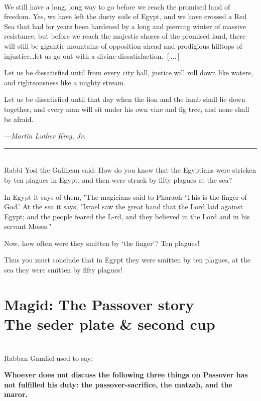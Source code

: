\documentclass[a4paper,10pt,openany]{memoir}
\newcommand{\HgEllipsis}{\ensuremath{\left[\ldots\right]}}
\newcommand{\HgSource}[1]{\hfill{\small---\itshape{#1}}}
\newcommand{\HgHL}[1]{{\Large\textbf{#1}\par\noindent\\[-.5em]}}
\newcommand{\HgFill}{\vfill \hrule \vfill}
\newenvironment{HgEnglish}{\strut\\\noindent}{\vspace{1em}}
\newcommand{\LSrc}{\textsuperscript{\upshape{[L]}}}
\begin{document}
\begin{HgEnglish}
We still have a long, long way to go before we reach the promised land of
freedom. Yes, we have left the dusty soils of Egypt, and we have crossed a Red
Sea that had for years been hardened by a long and piercing winter of massive
resistance, but before we reach the majestic shores of the promised land, there
will still be gigantic mountains of opposition ahead and prodigious hilltops of
injustice\ldots{}let us go out with a divine dissatisfaction. \HgEllipsis

Let us be dissatisfied until from every city hall, justice will roll down like
waters, and righteousness like a mighty
stream.

Let us be dissatisfied until that day when the lion and the lamb shall lie down
together, and every man will sit under
his own vine and fig tree, and none shall be afraid.

\HgSource{Martin Luther King, Jr.}
\end{HgEnglish}

\HgFill

\begin{HgEnglish}
Rabbi Yosi the Gallilean said: How do you know that the Egyptians were stricken
by ten plagues in Egypt, and then were struck by fifty plagues at the sea?

In Egypt it says of them, "The magicians said to Pharaoh `This is the finger of
God.' At the sea it says, "Israel saw the great hand that the Lord laid against
Egypt; and the people feared the L-rd, and they believed in the Lord and in his
servant Moses."

Now, how often were they smitten by `the finger'? Ten plagues!

Thus you must conclude that in Egypt they were smitten by ten plagues, at the
sea they were smitten by fifty plagues! \LSrc

\end{HgEnglish}

\chapter*{Magid: The Passover story\\ {\LARGE The seder plate \& second cup}}
\vspace{-2em}

\begin{HgEnglish}
Rabban Gamliel used to say: \HgHL{Whoever does not discuss the following three
things on Passover has not fulfilled his duty: the passover-sacrifice, the
matzah, and the maror.}
\end{HgEnglish}
\end{document}
